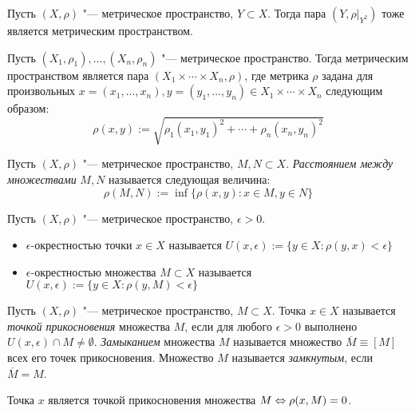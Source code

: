 \begin{note}
	Пусть $(X, \rho)$ "--- метрическое пространство, $Y \subset X$. Тогда пара $(Y, \rho|_{Y^2})$ тоже является метрическим пространством.
\end{note}

\begin{note}
	Пусть $(X_1, \rho_1), \dotsc, (X_n, \rho_n)$ "--- метрическое пространство. Тогда метрическим пространством является пара $(X_1 \times \dotsb \times X_n, \rho)$, где метрика $\rho$ задана для произвольных $x = (x_1, \dotsc, x_n), y = (y_1, \dotsc, y_n) \in X_1 \times \dotsb \times X_n$ следующим образом:
	\[\rho(x, y) := \sqrt{\rho_1(x_1, y_1)^2 + \dotsb + \rho_n(x_n, y_n)^2}\]
\end{note}

\begin{definition}
	Пусть $(X, \rho)$ "--- метрическое пространство, $M, N \subset X$. \textit{Расстоянием между множествами} $M, N$ называется следующая величина:
	\[\rho(M, N) := \inf\{\rho(x, y): x \in M, y \in N\}\]
\end{definition}

\begin{definition}
	Пусть $(X, \rho)$ "--- метрическое пространство, $\epsilon > 0$.
	\begin{itemize}
		\item $\epsilon$-окрестностью точки $x \in X$ называется $U(x, \epsilon) := \{y \in X: \rho(y, x) < \epsilon\}$
		
		\item $\epsilon$-окрестностью множества $M \subset X$ называется $U(x, \epsilon) := \{y \in X: \rho(y, M) < \epsilon\}$
	\end{itemize}
\end{definition}

\begin{definition}
	Пусть $(X, \rho)$ "--- метрическое пространство, $M \subset X$. Точка $x \in X$ называется \textit{точкой прикосновения} множества $M$, если для любого $\epsilon > 0$ выполнено $U(x, \epsilon) \cap M \ne \emptyset$. \textit{Замыканием} множества $M$ называется множество $\overline M \equiv [M]$ всех его точек прикосновения. Множество $M$ называется \textit{замкнутым}, если $\overline M = M$.
\end{definition}

\begin{note}
	Точка $x$ является точкой прикосновения множества $M \Leftrightarrow \rho(x, M) = 0$.
\end{note}


